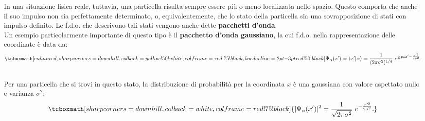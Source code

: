 \documentclass[a4paper,12pt,oneside]{book}
\begin{document}
In una situazione fisica reale, tuttavia, una particella risulta sempre essere più o meno localizzata nello spazio. Questo comporta che anche il suo impulso non sia perfettamente determinato, o, equivalentemente, che lo stato della particella sia una sovrapposizione di stati con impulso definito. Le f.d.o. che descrivono tali stati vengono anche dette \textbf{pacchetti d'onda}.\\

Un esempio particolarmente importante di questo tipo è il \textbf{pacchetto d'onda gaussiano}, la cui f.d.o. nella rappresentazione delle coordinate è data da:
	\begin{equation}
		\tcboxmath[enhanced,sharp corners=downhill ,colback=yellow!50!white,colframe=red!75!black, borderline={2pt}{-3pt}{red!50!black}]{
			\Psi_\alpha (x') = \langle x' | \alpha \rangle = \frac{1}{(2 \pi \sigma^2)^{1/4}}~  e^{\frac{i}{\hbar}p_0 x' - \frac{x'^2}{4 \sigma^2}}.
			}
	\end{equation}\\
	
Per una particella che si trovi in questo stato, la distribuzione di probabilità per la coordinata $x$ è una gaussiana con valore aspettato nullo e varianza $\sigma^2$:
	\begin{equation}
		\tcboxmath[sharp corners=downhill ,colback=white,colframe=red!75!black]{
			|\Psi_\alpha (x')|^2 = \frac{1}{\sqrt{2 \pi \sigma^2}}~   e^{- \frac{x'^2}{2 \sigma^2}}.
			}
	\end{equation}\\
	
\end{document}
